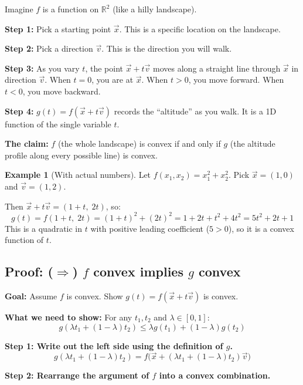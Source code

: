 \documentclass[10pt]{article}
\theoremstyle{definition}
\newtheorem{example}{Example}
\theoremstyle{plain}
\newcommand{\RR}{\mathbb{R}}
\begin{document}
\begin{tcolorbox}[colframe=black!50, title={\small Building intuition step by step}]
Imagine $f$ is a function on $\RR^2$ (like a hilly landscape).

\textbf{Step 1:} Pick a starting point $\vec{x}$. This is a specific location on the landscape.

\textbf{Step 2:} Pick a direction $\vec{v}$. This is the direction you will walk.

\textbf{Step 3:} As you vary $t$, the point $\vec{x} + t\vec{v}$ moves along a straight line through $\vec{x}$ in direction $\vec{v}$. When $t = 0$, you are at $\vec{x}$. When $t > 0$, you move forward. When $t < 0$, you move backward.

\textbf{Step 4:} $g(t) = f(\vec{x} + t\vec{v})$ records the ``altitude'' as you walk. It is a 1D function of the single variable $t$.

\textbf{The claim:} $f$ (the whole landscape) is convex if and only if $g$ (the altitude profile along every possible line) is convex.
\end{tcolorbox}

\begin{example}[With actual numbers]
Let $f(x_1, x_2) = x_1^2 + x_2^2$. Pick $\vec{x} = (1, 0)$ and $\vec{v} = (1, 2)$.

Then $\vec{x} + t\vec{v} = (1 + t, \; 2t)$, so:
\[
    g(t) = f(1 + t, \; 2t) = (1+t)^2 + (2t)^2 = 1 + 2t + t^2 + 4t^2 = 5t^2 + 2t + 1
\]
This is a quadratic in $t$ with positive leading coefficient ($5 > 0$), so it is a convex function of $t$. \checkmark
\end{example}

\subsection{Proof: ($\Rightarrow$) $f$ convex implies $g$ convex}

\textbf{Goal:} Assume $f$ is convex. Show $g(t) = f(\vec{x} + t\vec{v})$ is convex.

\textbf{What we need to show:} For any $t_1, t_2$ and $\lambda \in [0,1]$:
\[
    g(\lambda t_1 + (1-\lambda) t_2) \le \lambda g(t_1) + (1-\lambda) g(t_2)
\]

\textbf{Step 1: Write out the left side using the definition of $g$.}
\[
    g(\lambda t_1 + (1-\lambda)t_2) = f\big(\vec{x} + (\lambda t_1 + (1-\lambda)t_2)\vec{v}\big)
\]

\textbf{Step 2: Rearrange the argument of $f$ into a convex combination.}
\end{document}
